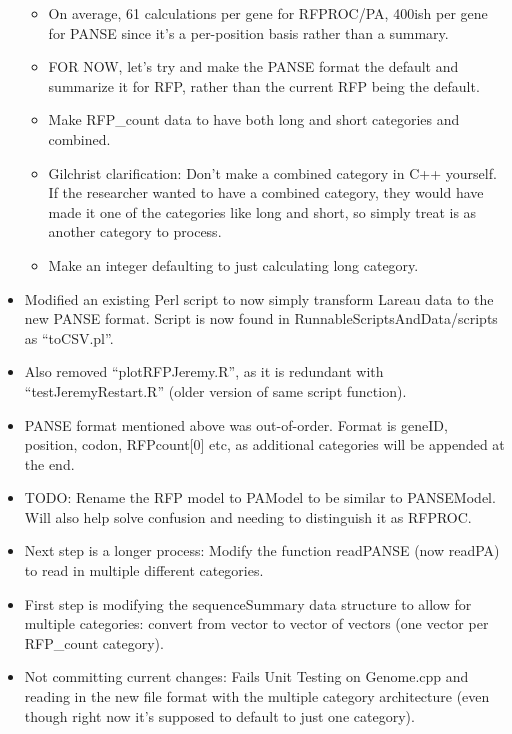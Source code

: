 \documentclass[12pt,hyperref]{labbook}
\newcommand{\sep}{\discretionary{}{}{}} %
\begin{document}
\begin{itemize}
\begin{itemize}
        \item On average, 61 calculations per gene for RFPROC/PA, 400ish per gene for PANSE since it's a per-position basis rather than a summary.
        \item FOR NOW, let's try and make the PANSE format the default and summarize it for RFP, rather than the current RFP being the default.
        \item Make RFP\_count data to have both long and short categories and combined.
        \item Gilchrist clarification: Don't make a combined category in C++ yourself.
        If the researcher wanted to have a combined category, they would have made it one of the categories like long and short, so simply treat is as another category to process.
        \item Make an integer defaulting to just calculating long category.
    \end{itemize}
    \item Modified an existing Perl script to now simply transform Lareau data to the new PANSE format.
    Script is now found in Runnable\sep Scripts\sep And\sep Data\sep /\sep scripts as \enquote{to\sep CSV\sep .\sep pl}.
    \item Also removed \enquote{plotRFPJeremy.R}, as it is redundant with \enquote{testJeremyRestart.R} (older version of same script function).
    \item PANSE format mentioned above was out-of-order.
    Format is geneID, position, codon, RFPcount[0] etc, as additional categories will be appended at the end.
    \item TODO: Rename the RFP model to PAModel to be similar to PANSEModel.
    Will also help solve confusion and needing to distinguish it as RFPROC.
    \item Next step is a longer process: Modify the function readPANSE (now readPA) to read in multiple different categories.
    \item First step is modifying the sequenceSummary data structure to allow for multiple categories: convert from vector to vector of vectors (one vector per RFP\_count category).
    \item Not committing current changes: Fails Unit Testing on Genome.cpp and reading in the new file format with the multiple category architecture (even though right now it's supposed to default to just one category).
\end{itemize}

\end{document}
